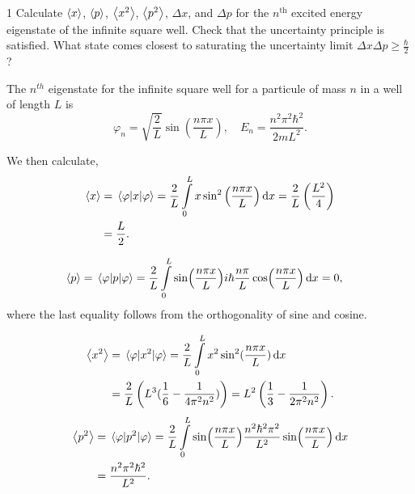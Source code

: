 \documentclass[11pt]{article}
\begin{document}
\begin{problem}{1}
  Calculate \(\ev{x}\), \(\ev{p}\), \(\ev{x^2}\), \(\ev{p^2}\), \(\Delta x\), and \(\Delta p\) for the \(n^{\text{th}}\) excited energy eigenstate of the infinite square well.
  Check that the uncertainty principle is satisfied.
  What state comes closest to saturating the uncertainty limit \(\Delta x\Delta p \geq \frac{\hbar}{2}\)?
\end{problem}
\begin{answer}
  The \( n^{th} \) eigenstate for the infinite square well for a particule of mass \( n \) in a well of length \( L \) is
  \begin{equation}
  \label{eq:1}
  \varphi_n = \sqrt{\frac{2}{L}}\sin(\frac{n\pi x}{L}), \quad E_n = \frac{n^2 \pi^2 \hbar^2}{2mL^2}.
\end{equation}

We then calculate,
\begin{equation}
\label{eq:2}
\begin{aligned}
  \ev{x} &= \ev{x}{\varphi} = \frac{2}{L} \int\limits_0^L x\sin^2\left(\frac{n\pi x}{L}\right) \dd{x} = \frac{2}{L}\left( \frac{L^2}{4} \right) \\
  &= \frac{L}{2}.
\end{aligned}
\end{equation}

\begin{equation}
\label{eq:3}
\begin{aligned}
  \ev{p} &= \ev{p}{\varphi} = \frac{2}{L} \int\limits_0^L \sin(\frac{n\pi x}{L}) i\hbar\frac{n\pi}{L}\cos(\frac{n\pi x}{L})\dd{x} = 0,
\end{aligned}
\end{equation}
where the last equality follows from the orthogonality of sine and cosine.

\begin{equation}
\label{eq:4}
\begin{aligned}
  \ev{x^2} &= \ev{x^2}{\varphi} = \frac{2}{L} \int\limits_0^L x^2 \sin^2(\frac{n\pi x}{L}) \dd{x} \\
           &= \frac{2}{L}\left( L^3(\frac{1}{6} - \frac{1}{4\pi^2n^2}) \right) = L^2\left(\frac{1}{3} - \frac{1}{2\pi^2 n^2}\right).
\end{aligned}
\end{equation}
\begin{equation}
\label{eq:5}
\begin{aligned}
  \ev{p^2} &= \ev{p^2}{\varphi} = \frac{2}{L} \int\limits_0^L \sin(\frac{n\pi x}{L})\frac{n^2\hbar^2\pi^2}{L^2}\sin(\frac{n\pi x}{L}) \dd{x} \\
  &= \frac{n^2 \pi^2 \hbar^2}{L^2}.
\end{aligned}
\end{equation}


\end{answer}
\end{document}
